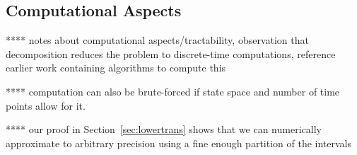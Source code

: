 \documentclass[10pt]{paper}
\theoremstyle{definition}
\newtheorem{proposition}[theorem]{Proposition}
\newtheorem{corollary}[theorem]{Corollary}
\newcommand{\reals}{\mathbb{R}}
\newcommand{\realspos}{\reals_{>0}}
\newcommand{\realsnonneg}{\reals_{\geq 0}}
\newcommand{\states}{\mathcal{X}}
\newcommand{\processes}{\mathbb{P}}
\newcommand{\wprocesses}{\processes^{\mathrm{W}}}
\newcommand{\gambles}{\mathcal{L}}
\newcommand{\rateset}{\mathcal{Q}}
\newcommand{\lrate}{\underline{Q}}
\newcommand{\norm}[1]{\left\lVert #1 \right\rVert}
\begin{document}
%
%

\subsection{Computational Aspects}\label{sec:tractability}

**** notes about computational aspects/tractability, observation that decomposition reduces the problem to discrete-time computations, reference earlier work containing algorithms to compute this

**** computation can also be brute-forced if state space and number of time points allow for it.

**** our proof in Section~\ref{sec:lowertrans} shows that we can numerically approximate to arbitrary precision using a fine enough partition of the intervals
\end{document}
